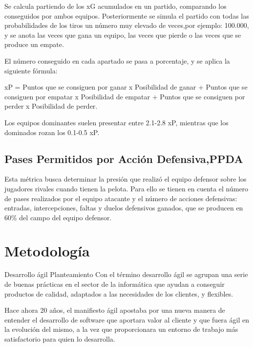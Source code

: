 Se calcula partiendo de los xG acumulados en un partido, comparando 
los conseguidos por ambos equipos. Posteriormente se simula 
el partido con todas las probabilidades de los tiros un número 
muy elevado de veces,por ejemplo: 100.000, y se anota las veces 
que gana un equipo, las veces que pierde o las veces que 
se produce un empate.

El número conseguido en cada apartado se pasa a porcentaje, 
y se aplica la siguiente fórmula:

xP = Puntos que se consiguen por ganar x Posibilidad de ganar + 
     Puntos que se consiguen por empatar x Posibilidad de empatar + 
     Puntos que se consiguen por perder x Posibilidad de perder.

Los equipos dominantes suelen presentar entre 2.1-2.8 xP, mientras 
que los dominados rozan los 0.1-0.5 xP. 

\subsection{Pases Permitidos por Acción Defensiva,PPDA}
Esta métrica busca determinar la presión que realizó el 
equipo defensor sobre los jugadores rivales cuando 
tienen la pelota. Para ello se tienen en cuenta el número 
de pases realizados por el equipo atacante y el número de 
acciones defensivas: entradas, intercepciones, faltas y duelos 
defensivos ganados, que se producen en 60\% del campo del 
equipo defensor.

\section{Metodología}

Desarrollo ágil
Planteamiento
Con el término desarrollo ágil se agrupan una serie de buenas prácticas en 
el sector de la informática que ayudan a conseguir productos de calidad, 
adaptados a las necesidades de los clientes, y flexibles. 

Hace ahora 20 años, el manifiesto ágil apostaba por una nueva manera de 
entender el desarrollo de software que aportara valor al cliente y que fuera 
ágil en la evolución del mismo, a la vez que proporcionara un entorno de 
trabajo más satisfactorio para quien lo desarrolla.


